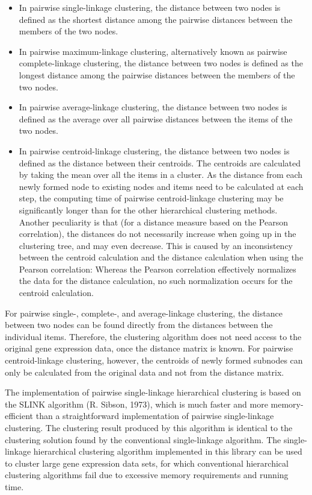 \documentclass{report}
\begin{document}
\begin{itemize}
\item
In pairwise single-linkage clustering, the distance between two nodes is defined as the shortest distance among the pairwise distances between the members of the two nodes.
\item
In pairwise maximum-linkage clustering, alternatively known as pairwise complete-linkage clustering, the distance between two nodes is defined as the longest distance among the pairwise distances between the members of the two nodes.
\item
In pairwise average-linkage clustering, the distance between two nodes is defined as the average over all pairwise distances between the items of the two nodes.
\item
In pairwise centroid-linkage clustering, the distance between two nodes is defined as the distance between their centroids. The centroids are calculated by taking the mean over all the items in a cluster. As the distance from each newly formed node to existing nodes and items need to be calculated at each step, the computing time of pairwise centroid-linkage clustering may be significantly longer than for the other hierarchical clustering methods. Another peculiarity is that (for a distance measure based on the Pearson correlation), the distances do not necessarily increase when going up in the clustering tree, and may even decrease. This is caused by an inconsistency between the centroid calculation and the distance calculation when using the Pearson correlation: Whereas the Pearson correlation effectively normalizes the data for the distance calculation, no such normalization occurs for the centroid calculation.
\end{itemize}

For pairwise single-, complete-, and average-linkage clustering, the distance between two nodes can be found directly from the distances between the individual items. Therefore, the clustering algorithm does not need access to the original gene expression data, once the distance matrix is known. For pairwise centroid-linkage clustering, however, the centroids of newly formed subnodes can only be calculated from the original data and not from the distance matrix.

The implementation of pairwise single-linkage hierarchical clustering is based on the SLINK algorithm (R. Sibson, 1973), which is much faster and more memory-efficient than a straightforward implementation of pairwise single-linkage clustering. The clustering result produced by this algorithm is identical to the clustering solution found by the conventional single-linkage algorithm. The single-linkage hierarchical clustering algorithm implemented in this library can be used to cluster large gene expression data sets, for which conventional hierarchical clustering algorithms fail due to excessive memory requirements and running time.
\end{document}
